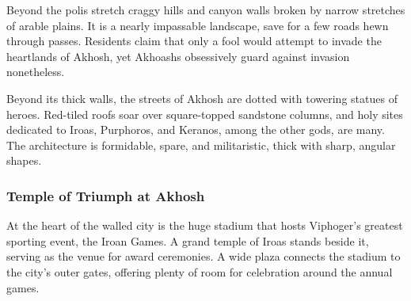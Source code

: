 
    \vspace{6.2cm}

    Beyond the polis stretch craggy hills and canyon walls broken by narrow stretches of arable plains.
    It is a nearly impassable landscape, save for a few roads hewn through passes.
    Residents claim that only a fool would attempt to invade the heartlands of Akhosh, yet Akhoashs obsessively guard against invasion nonetheless.

    Beyond its thick walls, the streets of Akhosh are dotted with towering statues of heroes.
    Red-tiled roofs soar over square-topped sandstone columns, and holy sites dedicated to Iroas, Purphoros, and Keranos, among the other gods, are many.
    The architecture is formidable, spare, and militaristic, thick with sharp, angular shapes.

    \subsubsection{Temple of Triumph at Akhosh}
        At the heart of the walled city is the huge stadium that hosts Viphoger's greatest sporting event, the Iroan Games.
        A grand temple of Iroas stands beside it, serving as the venue for award ceremonies.
        A wide plaza connects the stadium to the city's outer gates, offering plenty of room for celebration around the annual games.


